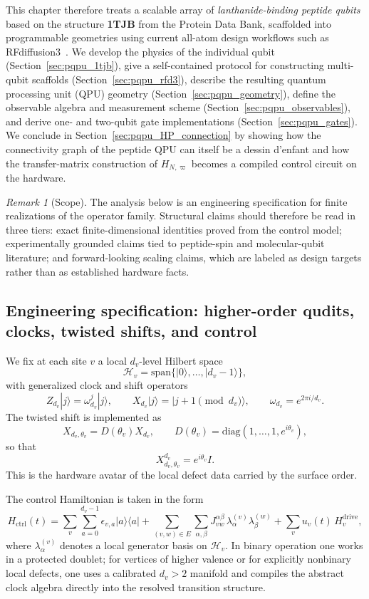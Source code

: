 \documentclass[11pt,oneside]{amsbook}
\numberwithin{equation}{section}
\theoremstyle{plain}
\theoremstyle{definition}
\theoremstyle{remark}
\newtheorem{remark}[theorem]{Remark}
\begin{document}
This chapter therefore treats a scalable array of \emph{lanthanide-binding
peptide qubits} based on the structure \textbf{1TJB} from the Protein Data
Bank, scaffolded into programmable geometries using current all-atom design
workflows such as RFdiffusion3~\cite{ButcherEtAl2025}.  We develop the physics
of the individual qubit (Section~\ref{sec:pqpu_1tjb}), give a self-contained
protocol for constructing multi-qubit scaffolds (Section~\ref{sec:pqpu_rfd3}),
describe the resulting quantum processing unit (QPU) geometry
(Section~\ref{sec:pqpu_geometry}), define the observable algebra and
measurement scheme (Section~\ref{sec:pqpu_observables}), and derive one- and
two-qubit gate implementations (Section~\ref{sec:pqpu_gates}).  We conclude in
Section~\ref{sec:pqpu_HP_connection} by showing how the connectivity graph of
the peptide QPU can itself be a dessin d'enfant and how the transfer-matrix
construction of $H_{N,\varpi}$ becomes a compiled control circuit on the
hardware.

\begin{remark}[Scope]
The analysis below is an engineering specification for finite realizations of
the operator family.  Structural claims should therefore be read in three
tiers: exact finite-dimensional identities proved from the control model;
experimentally grounded claims tied to peptide-spin and molecular-qubit
literature; and forward-looking scaling claims, which are labeled as design
targets rather than as established hardware facts.
\end{remark}

\subsection{Engineering specification: higher-order qudits, clocks, twisted shifts, and control}
\label{sec:pqpu_engineering_spec}

We fix at each site $v$ a local $d_v$-level Hilbert space
\[
\mathcal{H}_v=\mathrm{span}\{|0\rangle,\dots,|d_v-1\rangle\},
\]
with generalized clock and shift operators
\[
Z_{d_v}|j\rangle = \omega_{d_v}^j|j\rangle,
\qquad
X_{d_v}|j\rangle = |j+1 \!\!\!\pmod{d_v}\rangle,
\qquad
\omega_{d_v}=e^{2\pi i/d_v}.
\]
The twisted shift is implemented as
\[
X_{d_v,\theta_v}=D(\theta_v)X_{d_v},
\qquad
D(\theta_v)=\mathrm{diag}(1,\dots,1,e^{i\theta_v}),
\]
so that
\[
X_{d_v,\theta_v}^{d_v}=e^{i\theta_v}I.
\]
This is the hardware avatar of the local defect data carried by the surface
order.

The control Hamiltonian is taken in the form
\[
H_{\mathrm{ctrl}}(t)
=
\sum_v\sum_{a=0}^{d_v-1}\epsilon_{v,a}|a\rangle\langle a|
+\sum_{(v,w)\in E}\sum_{\alpha,\beta}J_{vw}^{\alpha\beta}\,\lambda_\alpha^{(v)}\lambda_\beta^{(w)}
+\sum_v u_v(t)\,H_v^{\mathrm{drive}},
\]
where $\lambda_\alpha^{(v)}$ denotes a local generator basis on
$\mathcal{H}_v$.  In binary operation one works in a protected doublet; for
vertices of higher valence or for explicitly nonbinary local defects, one uses
a calibrated $d_v>2$ manifold and compiles the abstract clock algebra directly
into the resolved transition structure.
\end{document}
